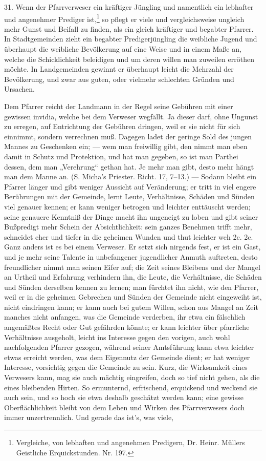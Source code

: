 31. Wenn der Pfarrverweser ein kräftiger Jüngling und namentlich ein lebhafter und angenehmer Prediger ist,\footnote{Vergleiche, von lebhaften und angenehmen Predigern, Dr. Heinr. Müllers Geistliche Erquickstunden. Nr. 197.} so pflegt er viele und vergleichsweise ungleich mehr Gunst und Beifall zu finden, als ein gleich kräftiger und begabter Pfarrer. In Stadtgemeinden zieht ein begabter Predigerjüngling die weibliche Jugend und überhaupt die weibliche Bevölkerung auf eine Weise und in einem Maße an, welche die Schicklichkeit beleidigen und um deren willen man zuweilen erröthen möchte. In Landgemeinden gewinnt er überhaupt leicht die Mehrzahl der Bevölkerung, und zwar aus guten, oder vielmehr schlechten Gründen und Ursachen.

Dem Pfarrer reicht der Landmann in der Regel seine Gebühren mit einer gewissen invidia, welche bei dem Verweser wegfällt. Ja dieser darf, ohne Ungunst zu erregen, auf Entrichtung der Gebühren dringen, weil er sie nicht für sich einnimmt, sondern verrechnen muß. Dagegen ladet der geringe Sold des jungen Mannes zu Geschenken ein; — wem man freiwillig gibt, den nimmt man eben damit in Schutz und Protektion, und hat man gegeben, so ist man Parthei dessen, dem man „Verehrung“ gethan hat. Je mehr man gibt, desto mehr hängt man dem Manne an. (S. Micha’s Priester. Richt. 17, 7–13.) — Sodann bleibt ein Pfarrer länger und gibt weniger Aussicht auf Veränderung; er tritt in viel engere Berührungen mit der Gemeinde, lernt Leute, Verhältnisse, Schäden und Sünden viel genauer kennen; er kann weniger betrogen und leichter
enttäuscht werden; seine genauere Kenntniß der Dinge macht ihn ungeneigt zu loben und gibt seiner Bußpredigt mehr Schein der Absichtlichkeit: sein ganzes Benehmen trifft mehr, schneidet eher und tiefer in die geheimen Wunden und thut leichter weh 2c. 2c. Ganz anders ist es bei einem Verweser. Er setzt sich nirgends fest, er ist ein Gast, und je mehr seine Talente in unbefangener jugendlicher Anmuth auftreten, desto freundlicher nimmt man seinen Eifer auf; die Zeit seines Bleibens und der Mangel an Urtheil und Erfahrung verhindern ihn, die Leute, die Verhältnisse, die Schäden und Sünden derselben kennen zu lernen; man fürchtet ihn nicht, wie den Pfarrer, weil er in die geheimen Gebrechen und Sünden der Gemeinde nicht eingeweiht ist, nicht eindringen kann; er kann auch bei gutem Willen, schon aus Mangel an Zeit manches nicht anfangen, was die Gemeinde verderben, ihr etwa ein fälschlich angemäßtes Recht oder Gut gefährden könnte; er kann leichter über pfarrliche Verhältnisse ausgeholt, leicht ins Interesse gegen den vorigen, auch wohl nachfolgenden Pfarrer gezogen, während seiner Amtsführung kann etwa leichter etwas erreicht werden, was dem Eigennutz der Gemeinde dient; er hat weniger Interesse, vorsichtig gegen die Gemeinde zu sein. Kurz, die Wirksamkeit eines Verwesers kann, mag sie auch mächtig eingreifen, doch so tief nicht gehen, als die eines bleibenden Hirten. So ermunternd, erfrischend, erquickend und weckend sie auch sein, und so hoch sie etwa deshalb geschätzt werden kann; eine gewisse Oberflächlichkeit bleibt von dem Leben und Wirken des Pfarrverwesers doch immer unzertrennlich. Und gerade das ist’s, was viele,
